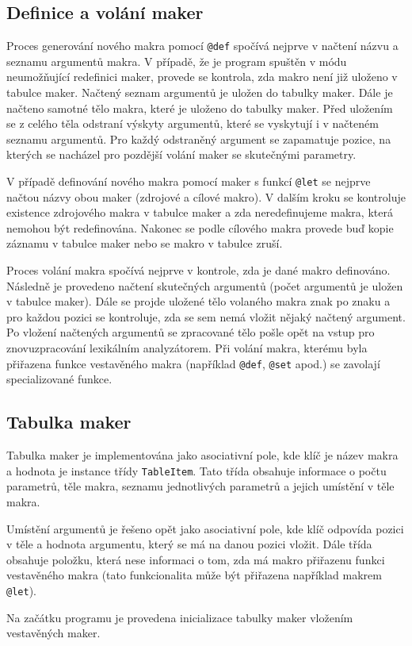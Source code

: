 \documentclass[a4paper,10pt]{article}
\begin{document}
\subsection{Definice a volání maker}
Proces generování nového makra pomocí \texttt{@def} spočívá nejprve v načtení názvu a seznamu argumentů makra.
V případě, že je program spuštěn v módu neumožňující redefinici maker, provede se kontrola, 
zda makro není již uloženo v tabulce maker. Načtený seznam argumentů je uložen do tabulky maker.
Dále je načteno samotné tělo makra, které je uloženo do tabulky maker. Před uložením
se z celého těla odstraní výskyty argumentů, které se vyskytují i v načteném seznamu argumentů.
Pro každý odstraněný argument se zapamatuje pozice, na kterých se nacházel pro pozdější
volání maker se skutečnými parametry. 

V případě definování nového makra pomocí maker s funkcí \texttt{@let} se nejprve
načtou názvy obou maker (zdrojové a cílové makro). V dalším kroku se kontroluje existence
zdrojového makra v tabulce maker a zda neredefinujeme makra, která nemohou být redefinována.
Nakonec se podle cílového makra provede buď kopie záznamu v tabulce maker nebo se makro v 
tabulce zruší.

Proces volání makra spočívá nejprve v kontrole, zda je dané makro definováno. Následně je 
provedeno načtení skutečných argumentů (počet argumentů je uložen v tabulce maker). Dále se 
projde uložené tělo volaného makra znak po znaku a pro každou pozici se kontroluje, zda se 
sem nemá vložit nějaký načtený argument. Po vložení načtených argumentů se zpracované tělo pošle 
opět na vstup pro znovuzpracování lexikálním analyzátorem. Při volání makra, kterému byla přiřazena funkce
vestavěného makra (například \texttt{@def}, \texttt{@set} apod.) se zavolají specializované funkce.

\subsection{Tabulka maker}
Tabulka maker je implementována jako asociativní pole, kde klíč je název makra a hodnota je instance
třídy \texttt{TableItem}. Tato třída obsahuje informace o počtu parametrů, těle makra, seznamu jednotlivých
parametrů a jejich umístění v těle makra. 

Umístění argumentů je řešeno opět jako asociativní pole, kde klíč 
odpovída pozici v těle a hodnota argumentu, který se má na danou pozici vložit. Dále třída obsahuje položku, 
která nese informaci o tom, zda má makro přiřazenu funkci vestavěného makra (tato funkcionalita může být 
přiřazena například makrem \texttt{@let}). 

Na začátku programu je provedena inicializace tabulky maker vložením vestavěných maker.
\end{document}
